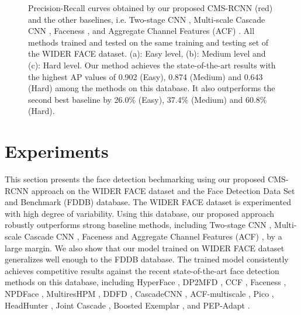 \documentclass[10pt,journal,cspaper,compsoc]{IEEEtran}
\begin{document}
\begin{figure*}[ht]
\centering
{}
\hspace{-5mm}
\hspace{-5mm}
\hspace{-5mm}
\caption{Precision-Recall curves obtained by our proposed CMS-RCNN (red) and the other baselines, i.e.
Two-stage CNN \cite{yang2016wider}, Multi-scale Cascade CNN \cite{yang2016wider}, Faceness \cite{yang2015faceness}, and Aggregate Channel Features (ACF) \cite{yang2014acf-multiscale}. All methods trained and tested on the same training and testing set of the WIDER FACE dataset. (a): Easy level, (b): Medium level and (c): Hard level. Our method achieves the state-of-the-art results with the highest AP values of 0.902 (Easy), 0.874 (Medium) and 0.643 (Hard) among the methods on this database. It also outperforms the second best baseline by 26.0\% (Easy), 37.4\% (Medium) and 60.8\% (Hard).}
\label{fig:roc_wider}
\end{figure*}

\section{Experiments}
\label{sec:ExptsRes}

This section presents the face detection bechmarking using our proposed CMS-RCNN approach on the WIDER FACE dataset \cite{yang2016wider} and the Face Detection Data Set and Benchmark (FDDB) \cite{fddbTech} database. The WIDER FACE dataset is experimented with high degree of variability. Using this database, our proposed approach robustly outperforms strong baseline methods, including Two-stage CNN \cite{yang2016wider}, Multi-scale Cascade CNN \cite{yang2016wider}, Faceness \cite{yang2015faceness} and Aggregate Channel Features (ACF) \cite{yang2014acf-multiscale}, by a large margin. 
We also show that our model trained on WIDER FACE dataset generalizes well enough to the FDDB database. The trained model consistently achieves competitive results against the recent state-of-the-art face detection methods on this database, including HyperFace \cite{ranjan2016hyperface}, DP2MFD \cite{ranjan2015dp2mfd}, CCF \cite{yang2015ccf}, Faceness \cite{yang2015faceness}, NPDFace \cite{liao2014npdface}, MultiresHPM \cite{ghiasi2015multireshpm}, DDFD \cite{farfade2015ddfd}, CascadeCNN \cite{li2015cascadecnn}, ACF-multiscale \cite{yang2014acf-multiscale}, Pico \cite{markuvs2013pico}, HeadHunter \cite{mathias2014face}, Joint Cascade \cite{chen2014jointcascade}, Boosted Exemplar \cite{li2014exemplar}, and PEP-Adapt \cite{li2013pep-adapt}. 
\end{document}
